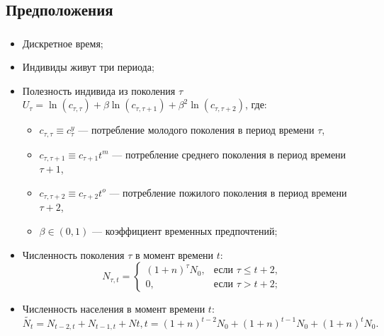 \documentclass[c, dvipsnames]{beamer}  %
\begin{document}
\subsection{Предположения}
\begin{frame}[shrink=5]

 \frametitle{\insertsection}
 \framesubtitle{\insertsubsection}
     \begin{itemize}
        \item Дискретное время;
        \item Индивиды живут три периода;
        \item Полезность индивида из поколения $\tau$ $U_\tau = \ln(c_{\tau,\tau}) + \beta \ln(c_{\tau, \tau+1 })+\beta^2\ln(c_{\tau, \tau+2 }) $, где:
        \begin{itemize}
        \item $c_{\tau,\tau} \equiv c_\tau^y $ --- потребление молодого поколения в период времени $\tau$,
        \item $c_{\tau,\tau+1} \equiv c_{\tau+1}t^m$ --- потребление среднего поколения в период времени $\tau+1$,
        \item $c_{\tau,\tau+2} \equiv c_{\tau+2}t^o$ --- потребление пожилого поколения в период времени $\tau+2$,
        \item $\beta \in (0, 1)$ --- коэффициент временных предпочтений;
        \end{itemize}
        \item Численность поколения $\tau$ в момент времени $t$:
        \begin{equation}
            N_{\tau,t} =  \begin{cases}
            (1+n)^\tau N_0,& \text{если } \tau \leq t + 2,\\
            0, & \text{если } \tau > t+ 2;
        \end{cases}
        \end{equation}
        \item Численность населения в момент времени $t$: 
        \begin{equation}
            \widetilde{N_t} = N_{t-2, t} + N_{t-1, t}+ N{t, t} = (1+n)^{t-2}N_0 + (1+n)^{t-1}N_0+(1+n)^t N_0.
        \end{equation}
        
    \end{itemize}
    
    

\end{frame}
\end{document}
